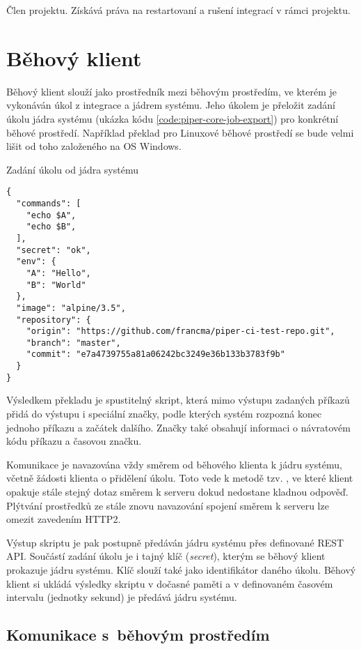 Člen projektu.
Získává práva na restartovaní a rušení integrací v rámci projektu.

\section{Běhový klient}

Běhový klient slouží jako prostředník mezi běhovým prostředím, ve kterém je vykonáván úkol z integrace a jádrem systému.
Jeho úkolem je přeložit zadání úkolu jádra systému (ukázka kódu \ref{code:piper-core-job-export}) pro konkrétní běhové prostředí.
Například překlad pro Linuxové běhové prostředí se bude velmi lišit od toho založeného na OS Windows.

\begin{listing}[ht]
\caption{\label{code:piper-core-job-export}Zadání úkolu od jádra systému}
\begin{verbatim}
{
  "commands": [
    "echo $A",
    "echo $B",
  ],
  "secret": "ok",
  "env": {
    "A": "Hello",
    "B": "World"
  },
  "image": "alpine/3.5",
  "repository": {
    "origin": "https://github.com/francma/piper-ci-test-repo.git",
    "branch": "master",
    "commit": "e7a4739755a81a06242bc3249e36b133b3783f9b"
  }
}
\end{verbatim}
\end{listing}

Výsledkem překladu je spustitelný skript, která mimo výstupu zadaných příkazů přidá do výstupu i speciální značky, podle kterých systém rozpozná konec jednoho příkazu a začátek dalšího.
Značky také obsahují informaci o návratovém kódu příkazu a časovou značku.

Komunikace je navazována vždy směrem od běhového klienta k jádru systému, včetně žádosti klienta o přidělení úkolu.
Toto vede k metodě tzv. , ve které klient opakuje stále stejný dotaz směrem k serveru dokud nedostane kladnou odpověď.
Plýtvání prostředků ze stále znovu navazování spojení směrem k serveru lze omezit zavedením HTTP2. 

Výstup skriptu je pak postupně předáván jádru systému přes definované REST API.
Součástí zadání úkolu je i tajný klíč (\textit{secret}), kterým se běhový klient prokazuje jádru systému. 
Klíč slouží také jako identifikátor daného úkolu.
Běhový klient si ukládá výsledky skriptu v dočasné paměti a v definovaném časovém intervalu (jednotky sekund) je předává jádru systému.

\subsection{Komunikace s~běhovým prostředím}


